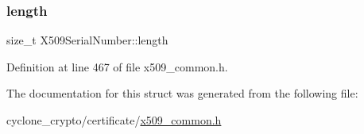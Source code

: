 \mbox{\label{structX509SerialNumber_ab076f0a46bcefa47cdc8135d5990ab78}} 
\subsubsection{\texorpdfstring{length}{length}}
{\footnotesize\ttfamily size\+\_\+t X509\+Serial\+Number\+::length}



Definition at line 467 of file x509\+\_\+common.\+h.



The documentation for this struct was generated from the following file\+:\begin{DoxyCompactItemize}
\item 
cyclone\+\_\+crypto/certificate/\hyperlink{certificate_2x509__common_8h}{x509\+\_\+common.\+h}\end{DoxyCompactItemize}
